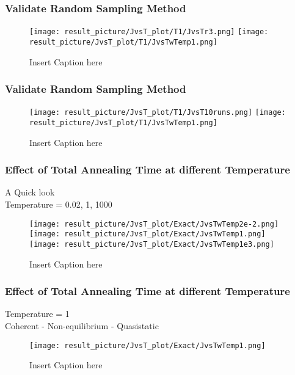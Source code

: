 \documentclass{beamer}
\begin{document}
\begin{frame}
	\frametitle{Validate Random Sampling Method}
	\begin{figure}
		\centering
		\texttt{[image: result\_picture/JvsT\_plot/T1/JvsTr3.png]}
		\hfill
		\texttt{[image: result\_picture/JvsT\_plot/T1/JvsTwTemp1.png]}		
		
		\caption{Insert Caption here}
	\end{figure}
\end{frame}

\begin{frame}
	\frametitle{Validate Random Sampling Method}
	\begin{figure}
		\centering
		\texttt{[image: result\_picture/JvsT\_plot/T1/JvsT10runs.png]}
		\hfill
		\texttt{[image: result\_picture/JvsT\_plot/T1/JvsTwTemp1.png]}		
		
		\caption{Insert Caption here}
	\end{figure}
\end{frame}

\begin{frame}
	\frametitle{Effect of Total Annealing Time at different Temperature}
	A Quick look\\
	Temperature = 0.02, 1, 1000
	\begin{figure}
		\centering
		\texttt{[image: result\_picture/JvsT\_plot/Exact/JvsTwTemp2e-2.png]}
		\hfill
		\texttt{[image: result\_picture/JvsT\_plot/Exact/JvsTwTemp1.png]}
		\hfill
		\texttt{[image: result\_picture/JvsT\_plot/Exact/JvsTwTemp1e3.png]}
		\caption{Insert Caption here}
	\end{figure}
\end{frame}

\begin{frame}
	\frametitle{Effect of Total Annealing Time at different Temperature}
	Temperature = 1\\
	Coherent - Non-equilibrium - Quasistatic
	\begin{figure}
		\centering
		\texttt{[image: result\_picture/JvsT\_plot/Exact/JvsTwTemp1.png]}
		\caption{Insert Caption here}
	\end{figure}
\end{frame}
\end{document}
